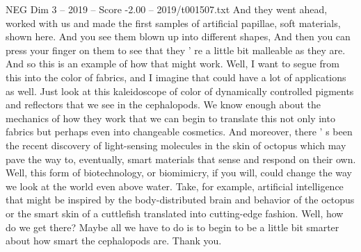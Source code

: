 \begin{textsample}{NEG Dim 3 – 2019 – Score -2.00 – 2019/t001507.txt}
And they went ahead, worked with us and made the first samples of artificial papillae, soft materials, shown here.
And you see them blown up into different shapes, And then you can press your finger on them to see that they ' re a little bit malleable as they are.
And so this is an example of how that might work.
Well, I want to segue from this into the color of fabrics, and I imagine that could have a lot of applications as well.
Just look at this kaleidoscope of color of dynamically controlled pigments and reflectors that we see in the cephalopods.
We know enough about the mechanics of how they work that we can begin to translate this not only into fabrics but perhaps even into changeable cosmetics.
And moreover, there ' s been the recent discovery of light-sensing molecules in the skin of octopus which may pave the way to, eventually, smart materials that sense and respond on their own.
Well, this form of biotechnology, or biomimicry, if you will, could change the way we look at the world even above water.
Take, for example, artificial intelligence that might be inspired by the body-distributed brain and behavior of the octopus or the smart skin of a cuttlefish translated into cutting-edge fashion.
Well, how do we get there?
Maybe all we have to do is to begin to be a little bit smarter about how smart the cephalopods are.
Thank you.

\end{textsample}
